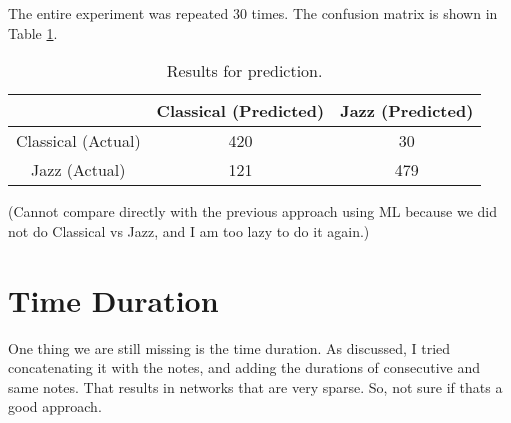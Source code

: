 \documentclass[]{article}
\begin{document}
The entire experiment was repeated $30$ times. The confusion matrix is shown in Table \ref{tab:prediction}.

\begin{table}
	\centering
	\begin{tabular}{c|c|c|}
		& Classical (Predicted) & Jazz (Predicted)  \\ 
		\hline 
		Classical (Actual)& 420  & 30  \\ 
		\hline 
		Jazz (Actual)& 121  & 479  \\ 
		\hline 
	\end{tabular} 
	\caption{Results for prediction.} \label{tab:prediction}
\end{table}

(Cannot compare directly with the previous approach using ML because we did not do Classical vs Jazz, and I am too lazy to do it again.)

\section{Time Duration}
One thing we are still missing is the time duration. As discussed, I tried concatenating it with the notes, and adding the durations of consecutive and same notes. That results in networks that are very sparse. So, not sure if thats a good approach.
\end{document}
